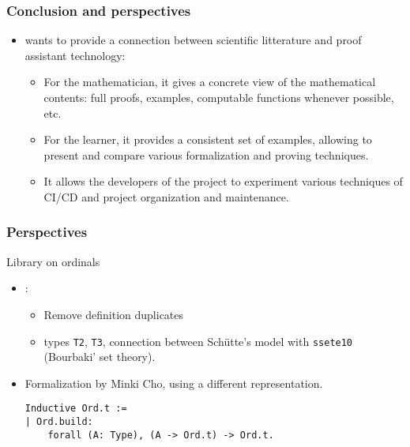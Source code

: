 \documentclass[10pt, fleqn]{beamer}
\begin{document}

\begin{frame}
  \frametitle{Conclusion and perspectives}
  \begin{block}{}
    \begin{itemize}
    \item \Hydras wants to provide  a connection between scientific litterature and proof assistant technology:
      \begin{itemize}
      \item For the mathematician, it gives a concrete view of the mathematical contents: full proofs, examples, computable functions whenever possible, etc.
        \item  For the \coq learner, it provides a consistent set of examples,
          allowing to present and compare various formalization and proving techniques.
          \item It allows the developers of the project to experiment various techniques of CI/CD and project organization and maintenance.
      \end{itemize}
    \end{itemize}
  \end{block}
  \end{frame}


\begin{frame}[fragile]
  \frametitle{Perspectives}
  \begin{block}{Library on ordinals}
      \begin{itemize}
  \item \gaiahydra:
    \begin{itemize}
    \item Remove definition duplicates
     \item types \texttt{T2}, \texttt{T3}, connection between 
    Schütte's model with \texttt{ssete10} (Bourbaki' set theory).
    \end{itemize}
    
  
    \item Formalization by Minki Cho, using a different representation.
{\color{blue}
\begin{verbatim}
Inductive Ord.t :=
| Ord.build: 
    forall (A: Type), (A -> Ord.t) -> Ord.t.
\end{verbatim}
}  
    \end{itemize}

  \end{block}
\end{frame}
\end{document}
